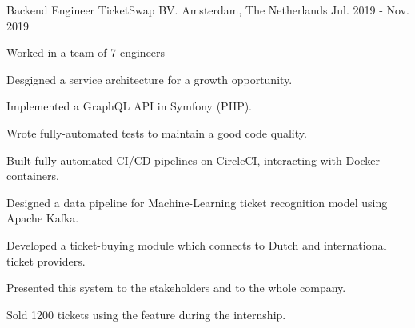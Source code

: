 

\begin{cventries}

  \cventry
    {Backend Engineer} %
    {TicketSwap BV.} %
    {Amsterdam, The Netherlands} %
    {Jul. 2019 - Nov. 2019} %
    {
      \begin{cvitems} %
        \item {Worked in a team of 7 engineers}
        \item {Desgigned a service architecture for a growth opportunity.}
        \item {Implemented a GraphQL API in Symfony (PHP).}
        \item {Wrote fully-automated tests to maintain a good code quality.}
        \item {Built fully-automated CI/CD pipelines on CircleCI, interacting with Docker containers.}
        \item {Designed a data pipeline for Machine-Learning ticket recognition model using Apache Kafka.}
        \item {Developed a ticket-buying module which connects to Dutch and international ticket providers.}
        \item {Presented this system to the stakeholders and to the whole company.}
        \item {Sold 1200 tickets using the feature during the internship.}
      \end{cvitems}
    }

\end{cventries}
